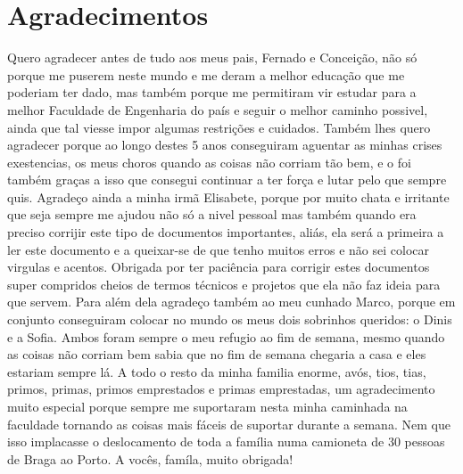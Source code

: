 \chapter*{Agradecimentos}
Quero agradecer antes de tudo aos meus pais, Fernado e Conceição, não só porque me puserem neste mundo e me deram a melhor educação que me poderiam ter dado, mas também porque me permitiram vir estudar para a melhor Faculdade de Engenharia do país e seguir o melhor caminho possivel, ainda que tal viesse impor algumas restrições e cuidados. Também lhes quero agradecer porque ao longo destes 5 anos conseguiram aguentar as minhas crises exestencias, os meus choros quando as coisas não corriam tão bem, e o foi também graças a isso que consegui continuar a ter força e lutar pelo que sempre quis. Agradeço ainda a minha irmã Elisabete, porque por muito chata e irritante que seja sempre me ajudou não só a nivel pessoal mas também quando era preciso corrijir este tipo de documentos importantes, aliás, ela será a primeira a ler este documento e a queixar-se de que tenho muitos erros e não sei colocar virgulas e acentos. Obrigada por ter paciência para corrigir estes documentos super compridos cheios de termos técnicos e projetos que ela não faz ideia para que servem. Para além dela agradeço também ao meu cunhado Marco, porque em conjunto conseguiram colocar no mundo os meus dois sobrinhos queridos: o Dinis e a Sofia. Ambos foram sempre o meu refugio ao fim de semana, mesmo quando as coisas não corriam bem sabia que no fim de semana chegaria a casa e eles estariam sempre lá. A todo o resto da minha familia enorme, avós, tios, tias, primos, primas, primos emprestados e primas emprestadas, um agradecimento muito especial porque sempre me suportaram nesta minha caminhada na faculdade tornando as coisas mais fáceis de suportar durante a semana. Nem que isso implacasse o deslocamento de toda a família numa camioneta de 30 pessoas de Braga ao Porto. A vocês, famíla, muito obrigada!


\vspace{10mm}
